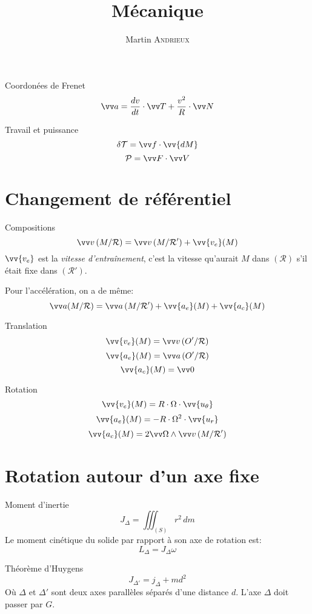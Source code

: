 \documentclass[french, a4paper, 11pt, twocolumn]{article}
\title{Mécanique}
\author{Martin \textsc{Andrieux}}
\date{}
\newcommand{\po}{\left(}         %
\newcommand{\pf}{\right)}        %
\newcommand{\pof}[1]{\po #1 \pf} %
\newcommand{\ur}{\vv{u_r}}          %
\newcommand{\uth}{\vv{u_\theta}}    %
\begin{document}
\maketitle

\begin{cadre}{Coordonées de Frenet}
  \[\vv a = \dfrac{dv}{dt}\cdot\vv T + \dfrac{v^{2}}{R}\cdot\vv N\]
\end{cadre}

\begin{cadre}{Travail et puissance}
  \[\delta\mathcal T = \vv f\cdot\vv{dM}\]
  \[\mathcal P = \vv F \cdot \vv V\]
\end{cadre}

\section{Changement de référentiel}
\begin{cadre}{Compositions}
  \[\vv v \pof{M/\mathcal R} = \vv v\pof{M/\mathcal R'} + \vv{v_{e}}(M)\]
  \(\vv{v_{e}}\) est la \emph{vitesse d'entraînement}, c'est la vitesse qu'aurait \(M\) dans \((\mathcal R)\) s'il était fixe dans \(\pof{\mathcal R'}\).

  Pour l'accélération, on a de même:
  \[\vv a(M/\mathcal R) = \vv a\pof{M/\mathcal R'} + \vv{a_{e}}(M) + \vv{a_{c}}(M)\]
\end{cadre}

\begin{cadre}{Translation}
  \[\vv{v_{e}}(M) = \vv v\pof{O'/\mathcal R}\]
  \[\vv{a_{e}}(M) = \vv a\pof{O'/\mathcal R}\]
  \[\vv{a_{c}}(M) = \vv 0\]
\end{cadre}

\begin{cadre}{Rotation}
  \[\vv{v_{e}}(M) = R\cdot\Omega\cdot\uth\]
  \[\vv{a_{e}}(M) = -R\cdot\Omega^{2}\cdot\ur\]
  \[\vv{a_{c}}(M) = 2\vv\Omega\wedge\vv v\pof{M/\mathcal R'}\]
\end{cadre}

\section{Rotation autour d'un axe fixe}
\begin{cadre}{Moment d'inertie}
  \[J_{\Delta} = \iiint_{(S)}r^{2}\,dm\]
  Le moment cinétique du solide par rapport à son axe de rotation est:
  \[L_{\Delta} = J_{\Delta}\omega\]
\end{cadre}

\begin{cadre}{Théorème d'Huygens}
  \[J_{\Delta'} = j_{\Delta} + md^{2}\]
  Où \(\Delta\) et \(\Delta'\) sont deux axes parallèles séparés d'une distance \(d\). L'axe \(\Delta\) doit passer par \(G\).
\end{cadre}
\end{document}
